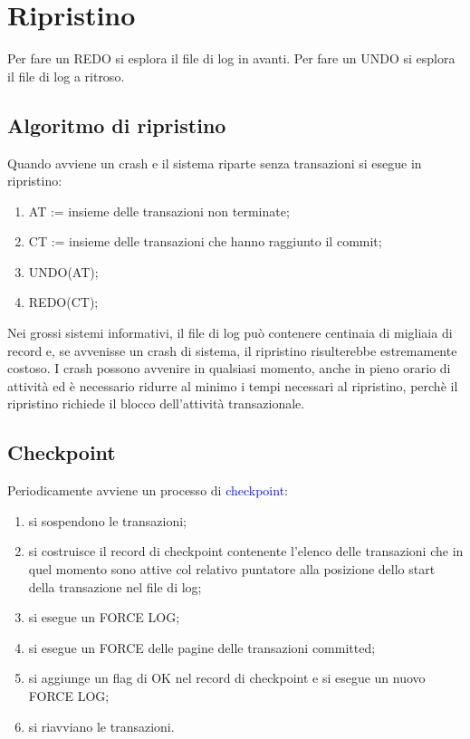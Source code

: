 \section{Ripristino}

Per fare un REDO si esplora il file di log in avanti. Per fare un UNDO si esplora il file di log a ritroso.

\subsection{Algoritmo di ripristino}

Quando avviene un crash e il sistema riparte senza transazioni si esegue in ripristino:

\begin{enumerate}
    \item AT := insieme delle transazioni non terminate;
    \item CT := insieme delle transazioni che hanno raggiunto il commit;
    \item UNDO(AT);
    \item REDO(CT);
\end{enumerate}

Nei grossi sistemi informativi, il file di log può contenere centinaia di migliaia di record e, se avvenisse un crash di sistema, il ripristino risulterebbe estremamente costoso. I crash possono avvenire in qualsiasi momento, anche in pieno orario di attività ed è necessario ridurre al minimo i tempi necessari al ripristino, perchè il ripristino richiede il blocco dell'attività transazionale.

\subsection{Checkpoint}

Periodicamente avviene un processo di \textcolor{blue}{checkpoint}:

\begin{enumerate}
    \item si sospendono le transazioni;
    \item si costruisce il record di checkpoint contenente l’elenco delle transazioni che in quel momento sono attive col relativo puntatore alla posizione dello start della transazione nel file di log;
    \item si esegue un FORCE LOG;
    \item si esegue un FORCE delle pagine delle transazioni committed;
    \item si aggiunge un flag di OK nel record di checkpoint e si esegue un nuovo FORCE LOG;
    \item si riavviano le transazioni.
\end{enumerate}

